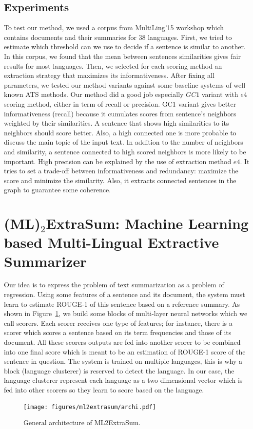 \documentclass[12pt, oneside, a4paper]{article}
\begin{document}
\subsection{Experiments}

To test our method, we used a corpus from MultiLing'15 workshop which contains documents and their summaries for 38 languages.
First, we tried to estimate which threshold can we use to decide if a sentence is similar to another. 
In this corpus, we found that the mean between sentences similarities gives fair results for most languages. 
Then, we selected for each scoring method an extraction strategy that maximizes its informativeness. 
After fixing all parameters, we tested our method variants against some baseline systems of well known ATS methods. 
Our method did a good job especially $ GC1 $ variant with $ e4 $ scoring method, either in term of recall or precision.
GC1 variant gives better informativeness (recall) because it cumulates scores from sentence's neighbors weighted by their similarities. 
A sentence that shows high similarities to its neighbors should score better. 
Also, a high connected one is more probable to discuss the main topic of the input text. 
In addition to the number of neighbors and similarity, a sentence connected to high scored neighbors is more likely to be important. 
High precision can be explained by the use of extraction method $ e4 $. 
It tries to set a trade-off between informativeness and redundancy: maximize the score and minimize the similarity. 
Also, it extracts connected sentences in the graph to guarantee some coherence. 



\section{(ML)$_\text{2}$ExtraSum: Machine Learning based Multi-Lingual Extractive Summarizer}

Our idea is to express the problem of text summarization as a problem of regression. 
Using some features of a sentence and its document, the system must learn to estimate ROUGE-1 of this sentence based on a reference summary. 
As shown in Figure~\ref{fig:ml2extrasum-archi}, we build some blocks of multi-layer neural networks which we call scorers. 
Each scorer receives one type of features; for instance, there is a scorer which scores a sentence based on its term frequencies and those of its document. 
All these scorers outputs are fed into another scorer to be combined into one final score which is meant to be an estimation of ROUGE-1 score of the sentence in question. 
The system is trained on multiple languages, this is why a block (language clusterer) is reserved to detect the language.
In our case, the language clusterer represent each language as a two dimensional vector which is fed into other scorers so they learn to score based on the language. 
\begin{figure}[ht]
	\centering
	\texttt{[image: figures/ml2extrasum/archi.pdf]} %
	\caption{General architecture of ML2ExtraSum.}
	\label{fig:ml2extrasum-archi}
\end{figure}
\end{document}
